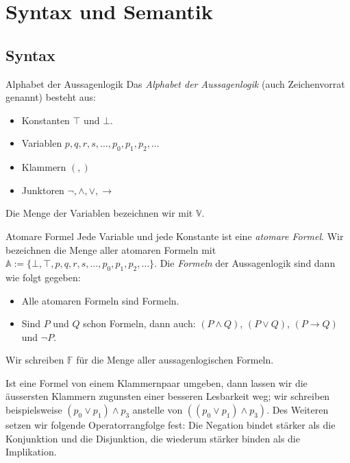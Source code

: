 \section{Syntax und Semantik}

\subsection{Syntax}

\begin{definition}{Alphabet der Aussagenlogik}
    Das \textit{Alphabet der Aussagenlogik} (auch Zeichenvorrat genannt) besteht aus:
    \begin{itemize}
        \item Konstanten $\top$ und $\bot$.
        \item Variablen $p,q,r,s,\dots,p_0,p_1,p_2,\dots$
        \item Klammern $(,)$
        \item Junktoren $\neg,\land,\lor,\to$
    \end{itemize}
    Die Menge der Variablen bezeichnen wir mit $\mathbb{V}$.
\end{definition}

\begin{definition}{Atomare Formel}
    Jede Variable und jede Konstante ist eine \textit{atomare Formel}. Wir bezeichnen die
    Menge aller atomaren Formeln mit $\mathbb{A}:=\{\bot,\top,p,q,r,s,\dots,p_0,p_1,p_2,\dots
    \}$.
    Die \textit{Formeln} der Aussagenlogik sind dann wie folgt gegeben:
    \begin{itemize}
        \item Alle atomaren Formeln sind Formeln.
        \item Sind $P$ und $Q$ schon Formeln, dann auch: $(P\land Q)$, $(P\lor Q)$, $(P\to Q)$ und $\neg P$.
    \end{itemize}
    Wir schreiben $\mathbb{F}$ für die Menge aller aussagenlogischen Formeln.
\end{definition}

\begin{remark}
    Ist eine Formel von einem Klammernpaar umgeben, dann lassen wir die äussersten Klammern zugunsten einer besseren Lesbarkeit weg; wir schreiben beispielsweise $(p_0\lor p_1)\land p_3$ anstelle von $((p_0\lor p_1)\land p_3)$. Des Weiteren setzen wir folgende Operatorrangfolge fest: Die Negation bindet stärker als die Konjunktion und die Disjunktion, die wiederum stärker binden als die Implikation.
\end{remark}

